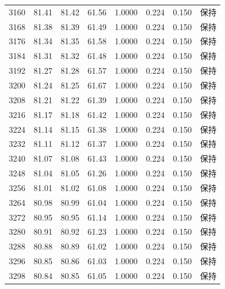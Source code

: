 \begin{longtable}{rrrrrrrr}
3160 & 81.41 & 81.42 & 61.56 & 1.0000 & 0.224 & 0.150 & 保持 \\
3168 & 81.38 & 81.39 & 61.49 & 1.0000 & 0.224 & 0.150 & 保持 \\
3176 & 81.34 & 81.35 & 61.58 & 1.0000 & 0.224 & 0.150 & 保持 \\
3184 & 81.31 & 81.32 & 61.48 & 1.0000 & 0.224 & 0.150 & 保持 \\
3192 & 81.27 & 81.28 & 61.57 & 1.0000 & 0.224 & 0.150 & 保持 \\
3200 & 81.24 & 81.25 & 61.67 & 1.0000 & 0.224 & 0.150 & 保持 \\
3208 & 81.21 & 81.22 & 61.39 & 1.0000 & 0.224 & 0.150 & 保持 \\
3216 & 81.17 & 81.18 & 61.42 & 1.0000 & 0.224 & 0.150 & 保持 \\
3224 & 81.14 & 81.15 & 61.38 & 1.0000 & 0.224 & 0.150 & 保持 \\
3232 & 81.11 & 81.12 & 61.37 & 1.0000 & 0.224 & 0.150 & 保持 \\
3240 & 81.07 & 81.08 & 61.43 & 1.0000 & 0.224 & 0.150 & 保持 \\
3248 & 81.04 & 81.05 & 61.26 & 1.0000 & 0.224 & 0.150 & 保持 \\
3256 & 81.01 & 81.02 & 61.08 & 1.0000 & 0.224 & 0.150 & 保持 \\
3264 & 80.98 & 80.99 & 61.04 & 1.0000 & 0.224 & 0.150 & 保持 \\
3272 & 80.95 & 80.95 & 61.14 & 1.0000 & 0.224 & 0.150 & 保持 \\
3280 & 80.91 & 80.92 & 61.23 & 1.0000 & 0.224 & 0.150 & 保持 \\
3288 & 80.88 & 80.89 & 61.02 & 1.0000 & 0.224 & 0.150 & 保持 \\
3296 & 80.85 & 80.86 & 61.03 & 1.0000 & 0.224 & 0.150 & 保持 \\
3298 & 80.84 & 80.85 & 61.05 & 1.0000 & 0.224 & 0.150 & 保持 \\
\end{longtable}
